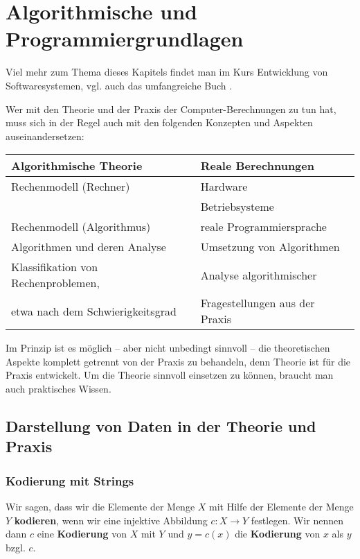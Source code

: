 \chapter{Algorithmische und Programmiergrundlagen}


\begin{bem} 
Viel mehr zum Thema dieses Kapitels findet man im Kurs Entwicklung von Softwaresystemen, vgl. auch das umfangreiche Buch \cite{GS11}. 
\end{bem} 

\begin{bem} Wer mit den Theorie und der Praxis der  Computer-Berechnungen zu tun hat, muss sich in der Regel auch mit den folgenden Konzepten und Aspekten auseinandersetzen: 
	\begin{center} 
			\begin{tabular}{l|l} 
				\textbf{Algorithmische Theorie} & \textbf{Reale Berechnungen}
				\\ \hline\hline 
				Rechenmodell (Rechner) & Hardware 
				\\  & Betriebsysteme 
				\\  Rechenmodell (Algorithmus) & reale Programmiersprache 
				\\ \hline Algorithmen und deren Analyse & Umsetzung von Algorithmen
				\\ \hline Klassifikation von Rechenproblemen, & Analyse algorithmischer 
				\\ etwa nach dem Schwierigkeitsgrad  & Fragestellungen aus der Praxis 
			\end{tabular} 
	\end{center} 
	Im Prinzip ist es möglich -- aber nicht unbedingt sinnvoll -- die theoretischen Aspekte komplett getrennt von der Praxis zu behandeln, denn Theorie ist für die Praxis entwickelt. Um die Theorie sinnvoll einsetzen zu können, braucht man auch praktisches Wissen. 
\end{bem} 

\section{Darstellung von Daten in der Theorie und Praxis} 

\subsection{Kodierung mit Strings} 

\begin{defn}
Wir sagen, dass wir die Elemente der  Menge $X$ mit Hilfe der Elemente der Menge $Y$ \textbf{kodieren}, wenn wir eine  injektive Abbildung $c : X \to Y$ festlegen. Wir nennen dann $c$ eine \textbf{Kodierung} von $X$ mit $Y$ und $y=c(x)$ die \textbf{Kodierung} von $x$ als $y$ bzgl. $c$.  
\end{defn}


